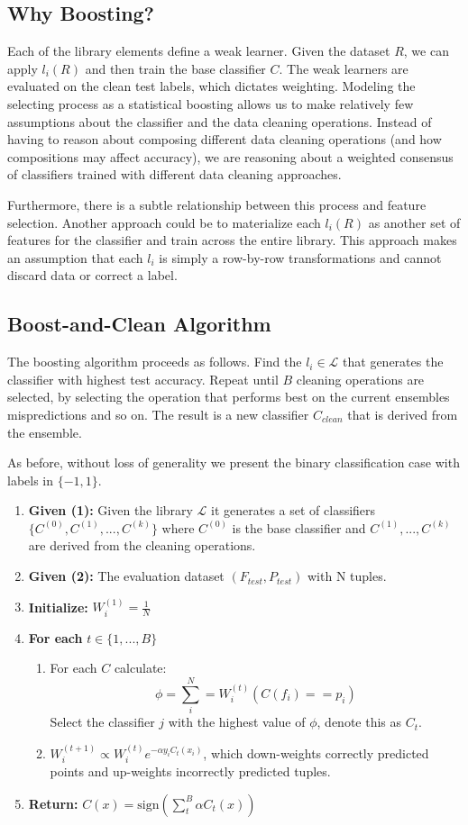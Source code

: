 \subsection{Why Boosting?}
Each of the library elements define a weak learner.
Given the dataset $R$, we can apply $l_i(R)$ and then train the base classifier $C$. 
The weak learners are evaluated on the clean test labels, which dictates weighting.
Modeling the selecting process as a statistical boosting allows us to make relatively few assumptions about the classifier and the data cleaning operations. 
Instead of having to reason about composing different data cleaning operations (and how compositions may affect accuracy), we are reasoning about a weighted consensus of classifiers trained with different data cleaning approaches.

Furthermore, there is a subtle relationship between this process and feature selection.
Another approach could be to materialize each $l_i(R)$ as another set of features for the classifier and train across the entire library.
This approach makes an assumption that each $l_i$ is simply a row-by-row transformations and cannot discard data or correct a label.

\subsection{Boost-and-Clean Algorithm}
The boosting algorithm proceeds as follows.
Find the $l_i \in \mathcal{L}$ that generates the classifier with highest test accuracy.
Repeat until $B$ cleaning operations are selected, by selecting the operation that performs best on the current ensembles mispredictions and so on.
The result is a new classifier $C_{clean}$ that is derived from the ensemble.

As before, without loss of generality we present the binary classification case with labels in $\{-1,1\}$.
\begin{enumerate}
    \item \textbf{Given (1): } Given the library $\mathcal{L}$ it generates a set of classifiers $\{C^{(0)}, C^{(1)},...,C^{(k)}\}$ where $C^{(0)}$ is the base classifier and $C^{(1)},...,C^{(k)}$ are derived from the cleaning operations.
    \item \textbf{Given (2): } The evaluation dataset $(F_{test}, P_{test})$ with N tuples.
    \item \textbf{Initialize: } $W^{(1)}_i = \frac{1}{N}$
    \item \textbf{For each } $t \in \{1,...,B\}$ 
    \begin{enumerate}
    \item For each $C$ calculate: \[\phi = \sum_i^N = W^{(t)}_i (C(f_i) == p_i)\]
    Select the classifier $j$ with the highest value of $\phi$, denote this as $C_t$.
    \item $W^{(t+1)}_i \propto W^{(t)}_i e^{-\alpha y_i C_t(x_i)}$, which down-weights correctly predicted points and up-weights incorrectly predicted tuples.
    \end{enumerate}
    \item \textbf{Return: } $C(x) = \text{sign}(\sum_t^B \alpha C_t(x) )$  
\end{enumerate}

